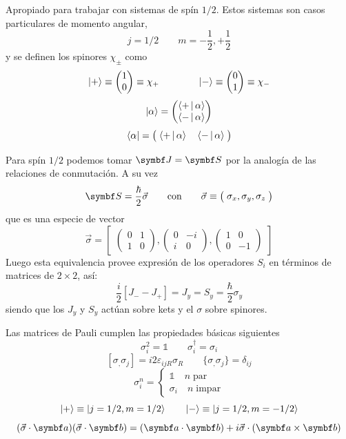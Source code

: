\documentclass[10pt,oneside]{CBFT_book}
\begin{document}
Apropiado para trabajar con sistemas de spín $1/2$. Estos sistemas son casos particulares de momento angular,
\[
	j = 1/2 \qquad m=-\frac{1}{2},+\frac{1}{2}
\]
y se definen los spinores $\chi_\pm$ como
\[
	\Ket{+} \equiv  \begin{pmatrix} 1 \\ 0  \end{pmatrix} \equiv  \chi_+ \qquad \qquad
	\Ket{-} \equiv  \begin{pmatrix} 0 \\ 1  \end{pmatrix} \equiv  \chi_-
\]
\[
	\Ket{\alpha} = \begin{pmatrix}   \Braket{+|\alpha} \\ \Braket{-|\alpha}  \end{pmatrix}
\]
\[
	\Bra{\alpha} = \begin{pmatrix}  \; \Braket{+|\alpha} \quad \Braket{-|\alpha} \;  \end{pmatrix}
\]

Para spín $1/2$ podemos tomar $\vb{J} = \vb{S}$ por la analogía de las relaciones de conmutación.
A su vez 
\[
	\vb{S} = \frac{\hbar}{2} \vec{\sigma} \qquad \text{con} \qquad \vec{\sigma} \equiv 
	\begin{pmatrix} \; \sigma_x, \sigma_y, \sigma_z \; \end{pmatrix}
\]
que es una especie de vector 
\[
	\vec{\sigma}  =
	\begin{bmatrix}
	 \begin{pmatrix} 0 & 1 \\ 1 & 0 \end{pmatrix}, \begin{pmatrix} 0 & -i \\ i & 0 \end{pmatrix},
	 \begin{pmatrix} 1 & 0 \\ 0 & -1 \end{pmatrix} 
	\end{bmatrix}
\]
Luego esta equivalencia provee expresión de los operadores $S_i$ en términos de matrices de $2\times 2$, así:
\[
	\frac{i}{2}[ J_- - J_+] = J_y = S_y = \frac{\hbar}{2} \sigma_y
\]
siendo que los $J_y$ y $S_y$ actúan sobre kets y el $\sigma$ sobre spinores.

Las matrices de Pauli cumplen las propiedades básicas siguientes 
\[
	\sigma^2_i = \mathbb{1} \qquad \sigma_i^\dagger = \sigma_i
\]
\[
	[ \sigma_, \sigma_j ] = i2\varepsilon_{ijR}\sigma_R \qquad \{\sigma_, \sigma_j \}= \delta_{ij}
\]
\[
	\sigma_i^n = \begin{cases} \mathbb{1} \quad n \; \text{par} \\ \sigma_i \quad n \; \text{impar} 
\end{cases}
\]
\[
	\Ket{+} \equiv \Ket{j=1/2 , m = 1/2} \qquad \Ket{-} \equiv \Ket{j=1/2 , m = -1/2} 
\]
\[
	(\vec{\sigma}\cdot\vb{a})(\vec{\sigma}\cdot\vb{b}) = 
		(\vb{a}\cdot\vb{b}) + i \vec{\sigma}\cdot(\vb{a}\times\vb{b})
\]
\end{document}

